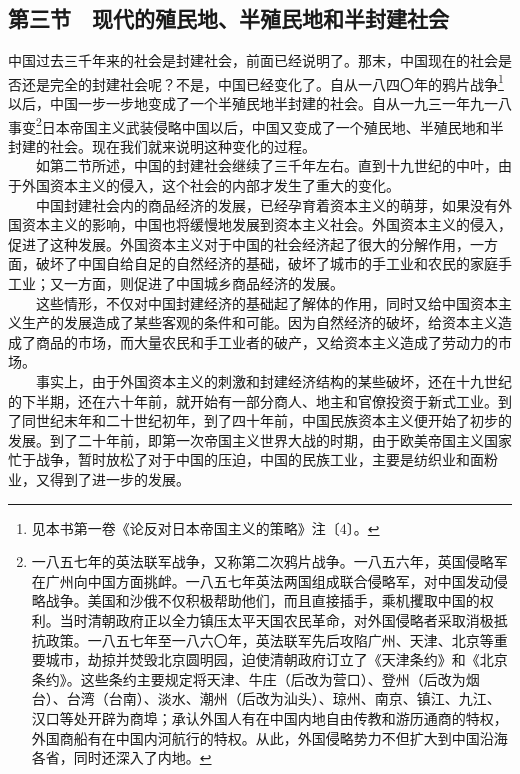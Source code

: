 \documentclass[cn,11pt,chinese]{elegantbook}
\def\myformat#1{\hfil\hfil #1}
\begin{document}
\subsection*{\myformat{第三节　现代的殖民地、半殖民地和半封建社会}}
中国过去三千年来的社会是封建社会，前面已经说明了。那末，中国现在的社会是否还是完全的封建社会呢？不是，中国已经变化了。自从一八四〇年的鸦片战争\footnote[16]{ 见本书第一卷《论反对日本帝国主义的策略》注〔4〕。}以后，中国一步一步地变成了一个半殖民地半封建的社会。自从一九三一年九一八事变\footnote[17]{ 一八五七年的英法联军战争，又称第二次鸦片战争。一八五六年，英国侵略军在广州向中国方面挑衅。一八五七年英法两国组成联合侵略军，对中国发动侵略战争。美国和沙俄不仅积极帮助他们，而且直接插手，乘机攫取中国的权利。当时清朝政府正以全力镇压太平天国农民革命，对外国侵略者采取消极抵抗政策。一八五七年至一八六〇年，英法联军先后攻陷广州、天津、北京等重要城市，劫掠并焚毁北京圆明园，迫使清朝政府订立了《天津条约》和《北京条约》。这些条约主要规定将天津、牛庄（后改为营口）、登州（后改为烟台）、台湾（台南）、淡水、潮州（后改为汕头）、琼州、南京、镇江、九江、汉口等处开辟为商埠；承认外国人有在中国内地自由传教和游历通商的特权，外国商船有在中国内河航行的特权。从此，外国侵略势力不但扩大到中国沿海各省，同时还深入了内地。}日本帝国主义武装侵略中国以后，中国又变成了一个殖民地、半殖民地和半封建的社会。现在我们就来说明这种变化的过程。\\
　　如第二节所述，中国的封建社会继续了三千年左右。直到十九世纪的中叶，由于外国资本主义的侵入，这个社会的内部才发生了重大的变化。\\
　　中国封建社会内的商品经济的发展，已经孕育着资本主义的萌芽，如果没有外国资本主义的影响，中国也将缓慢地发展到资本主义社会。外国资本主义的侵入，促进了这种发展。外国资本主义对于中国的社会经济起了很大的分解作用，一方面，破坏了中国自给自足的自然经济的基础，破坏了城市的手工业和农民的家庭手工业；又一方面，则促进了中国城乡商品经济的发展。\\
　　这些情形，不仅对中国封建经济的基础起了解体的作用，同时又给中国资本主义生产的发展造成了某些客观的条件和可能。因为自然经济的破坏，给资本主义造成了商品的市场，而大量农民和手工业者的破产，又给资本主义造成了劳动力的市场。\\
　　事实上，由于外国资本主义的刺激和封建经济结构的某些破坏，还在十九世纪的下半期，还在六十年前，就开始有一部分商人、地主和官僚投资于新式工业。到了同世纪末年和二十世纪初年，到了四十年前，中国民族资本主义便开始了初步的发展。到了二十年前，即第一次帝国主义世界大战的时期，由于欧美帝国主义国家忙于战争，暂时放松了对于中国的压迫，中国的民族工业，主要是纺织业和面粉业，又得到了进一步的发展。\\
\end{document}
